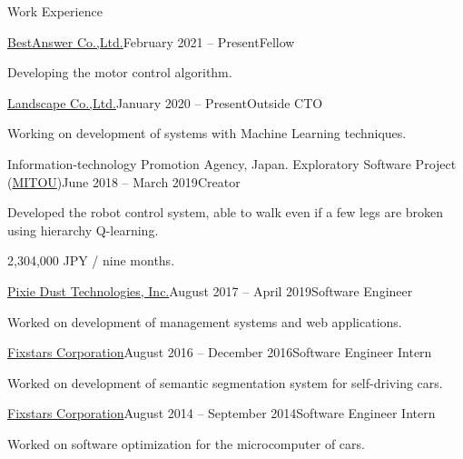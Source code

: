 \documentclass{resume} %
\begin{document}
\begin{rSection}{Work Experience}

    \begin{rSubsection}{\href{https://www.landscape.co.jp/}{BestAnswer Co.,Ltd.}}{February 2021 -- Present}{Fellow}{}
    \item Developing the motor control algorithm.
    \end{rSubsection}

    \begin{rSubsection}{\href{https://www.landscape.co.jp/}{Landscape Co.,Ltd.}}{January 2020 -- Present}{Outside CTO}{}
    \item Working on development of systems with Machine Learning techniques.
    \end{rSubsection}

    \begin{rSubsection}{Information-technology Promotion Agency, Japan. Exploratory Software Project (\href{https://www.mitou.org/}{MITOU})}{June 2018 -- March 2019}{Creator}{}
    \item Developed the robot control system, able to walk even if a few legs are broken using hierarchy Q-learning.
    \item 2,304,000 JPY / nine months.
    \end{rSubsection}

    \begin{rSubsection}{\href{http://pixiedusttech.com/}{Pixie Dust Technologies, Inc.}}{August 2017 -- April 2019}{Software Engineer}{}
    \item Worked on development of management systems and web applications.
    \end{rSubsection}

    \begin{rSubsection}{\href{https://www.fixstars.com/en/}{Fixstars Corporation}}{August 2016 -- December 2016}{Software Engineer Intern}{}
    \item Worked on development of semantic segmentation system for self-driving cars.
    \end{rSubsection}

    \begin{rSubsection}{\href{https://www.fixstars.com/en/}{Fixstars Corporation}}{August 2014 -- September 2014}{Software Engineer Intern}{}
    \item Worked on software optimization for the microcomputer of cars.
    \end{rSubsection}

\end{rSection}
\end{document}
